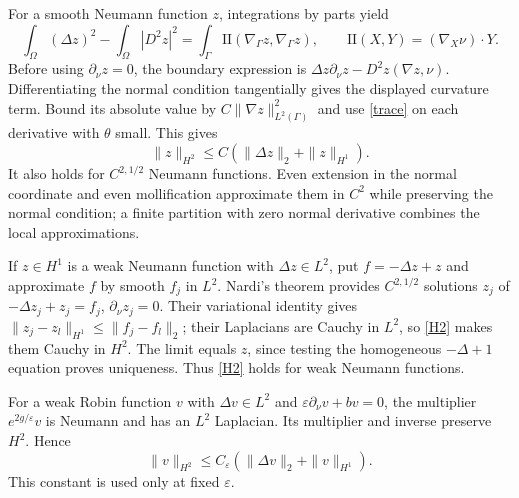 \documentclass[11pt]{article}
\theoremstyle{remark}
\newcommand{\eps}{\varepsilon}
\begin{document}
For a smooth Neumann function $z$, integrations by parts yield
\[
 \int_\Omega(\Delta z)^2-\int_\Omega|D^2z|^2
       =\int_\Gamma\mathrm{II}(\nabla_\Gamma z,\nabla_\Gamma z),
 \qquad\mathrm{II}(X,Y)=(\nabla_X\nu)\cdot Y.
\]
Before using $\partial_\nu z=0$, the boundary expression is
$\Delta z\partial_\nu z-D^2z(\nabla z,\nu)$.
Differentiating the normal condition tangentially gives the displayed
curvature term. Bound its absolute value by
$C\|\nabla z\|_{L^2(\Gamma)}^2$ and use \eqref{trace} on each derivative
with $\theta$ small. This gives
\begin{equation}\label{H2}
 \|z\|_{H^2}\le C(\|\Delta z\|_2+\|z\|_{H^1}).
\end{equation}
It also holds for $C^{2,1/2}$ Neumann functions. Even extension in the normal
coordinate and even mollification approximate them in $C^2$ while preserving
the normal condition; a finite partition with zero normal derivative
combines the local approximations.

If $z\in H^1$ is a weak Neumann function with $\Delta z\in L^2$, put
$f=-\Delta z+z$ and approximate $f$ by smooth $f_j$ in $L^2$.
Nardi's theorem \cite[Theorem 5.2]{Nardi} provides $C^{2,1/2}$ solutions
$z_j$ of $-\Delta z_j+z_j=f_j$, $\partial_\nu z_j=0$.
Their variational identity gives
$\|z_j-z_l\|_{H^1}\le\|f_j-f_l\|_2$; their Laplacians are Cauchy in $L^2$,
so \eqref{H2} makes them Cauchy in $H^2$. The limit equals $z$, since
testing the homogeneous $-\Delta+1$ equation proves uniqueness.
Thus \eqref{H2} holds for weak Neumann functions.

For a weak Robin function $v$ with $\Delta v\in L^2$ and
$\eps\partial_\nu v+bv=0$, the multiplier $e^{2g/\eps}v$ is Neumann and
has an $L^2$ Laplacian. Its multiplier and inverse preserve $H^2$. Hence
\begin{equation}\label{Robin-H2}
 \|v\|_{H^2}\le C_\eps(\|\Delta v\|_2+\|v\|_{H^1}).
\end{equation}
This constant is used only at fixed $\eps$.
\end{document}
